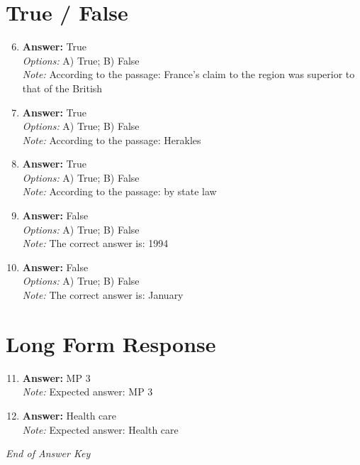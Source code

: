 \documentclass[12pt]{article}
\begin{document}
\section*{True / False}
\begin{enumerate}[label=\arabic*.]
\setcounter{enumi}{5}
\item \textbf{Answer:} True
\\ \textit{Options:} A) True; B) False
\\ \textit{Note:} According to the passage: France's claim to the region was superior to that of the British
\item \textbf{Answer:} True
\\ \textit{Options:} A) True; B) False
\\ \textit{Note:} According to the passage: Herakles
\item \textbf{Answer:} True
\\ \textit{Options:} A) True; B) False
\\ \textit{Note:} According to the passage: by state law
\item \textbf{Answer:} False
\\ \textit{Options:} A) True; B) False
\\ \textit{Note:} The correct answer is: 1994
\item \textbf{Answer:} False
\\ \textit{Options:} A) True; B) False
\\ \textit{Note:} The correct answer is: January
\end{enumerate}

\section*{Long Form Response}
\begin{enumerate}[label=\arabic*.]
\setcounter{enumi}{10}
\item \textbf{Answer:} MP 3
\\ \textit{Note:} Expected answer: MP 3
\item \textbf{Answer:} Health care
\\ \textit{Note:} Expected answer: Health care
\end{enumerate}

\vfill
\noindent\textit{End of Answer Key}
\end{document}
